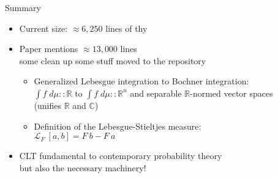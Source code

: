 \documentclass[usepdftitle=false]{beamer}
\begin{document}
\begin{frame}{Summary} %
\begin{itemize}
\item Current size: $\approx 6,250$ lines of thy
\item Paper mentions $\approx 13,000$ lines\\
  some clean up some stuff moved to the repository
\begin{itemize}

\item Generalized Lebesgue integration to Bochner integration: \\
  $\int {f}\; d\!\mu :: \mathbb{R}$ to $\int {f}\; d\!\mu :: \mathbb{R}^n$ and separable $\mathbb{R}$-normed vector spaces \\
  (unifies $\mathbb{R}$ and $\mathbb{C}$)

\item Definition of the Lebesgue-Stieltjes measure: \\ 
  $\mathcal{L}_F~[a, b] = F~b - F~a$
\end{itemize}

\item CLT fundamental to contemporary probability theory\\
  but also the necessary machinery!

\end{itemize}
\end{frame} %
\end{document}
